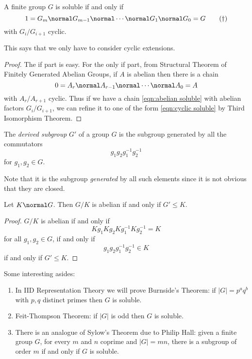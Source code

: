 \documentclass[a4paper]{article}
\begin{document}
\begin{lemma}
  A finite group \(G\) is soluble if and only if
  \begin{equation*}
    \label{eqn:cyclic soluble}
    1 = G_m \normal G_{m - 1} \normal \cdots \normal G_1 \normal G_0 = G
    \tag{\(\dag\)}
  \end{equation*}
  with \(G_i/G_{i + 1}\) cyclic.
\end{lemma}
This says that we only have to consider cyclic extensions.

\begin{proof}
  The if part is easy. For the only if part, from Structural Theorem of Finitely Generated Abelian Groups, if \(A\) is abelian then there is a chain
  \[
    0 = A_r \normal A_{r - 1} \normal \cdots \normal A_0 = A
  \]
  with \(A_r/A_{r + 1}\) cyclic. Thus if we have a chain \eqref{eqn:abelian soluble} with abelian factors \(G_i/G_{i + 1}\), we can refine it to one of the form \eqref{eqn:cyclic soluble} by Third Isomorphism Theorem.
\end{proof}

\begin{definition}
  The \emph{derived subgroup} \(G'\) of a group \(G\) is the subgroup generated by all the commutators
  \[
    g_1g_2g_1^{-1}g_2^{-1}
  \]
  for \(g_1, g_2 \in G\).
\end{definition}

Note that it is the subgroup \emph{generated} by all such elements since it is not obvious that they are closed.

\begin{lemma}
  Let \(K \normal G\). Then \(G/K\) is abelian if and only if \(G' \leq K\).
\end{lemma}

\begin{proof}
  \(G/K\) is abelian if and only if
  \[
    Kg_1Kg_2Kg_1^{-1}Kg_2^{-1} = K
  \]
  for all \(g_1, g_2 \in G\), if and only if
  \[
    g_1g_2g_1^{-1}g_2^{-1} \in K
  \]
  if and only if \(G' \leq K\).
\end{proof}

\begin{remark}
  Some interesting asides:
  \begin{enumerate}
  \item In IID Representation Theory we will prove Burnside's Theorem: if \(|G| = p^aq^b\) with \(p, q\) distinct primes then \(G\) is soluble.
  \item Feit-Thompson Theorem: if \(|G|\) is odd then \(G\) is soluble.
  \item There is an analogue of Sylow's Theorem due to Philip Hall: given a finite group \(G\), for every \(m\) and \(n\) coprime and \(|G| = mn\), there is a subgroup of order \(m\) if and only if \(G\) is soluble.
  \end{enumerate}
\end{remark}
\end{document}
